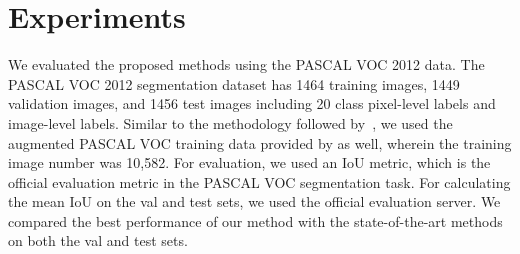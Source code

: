 \documentclass[10pt,twocolumn,letterpaper]{article}
\begin{document}
\section{Experiments}
We evaluated the proposed methods using the PASCAL VOC 2012 data. 
The PASCAL VOC 2012 segmentation dataset has 1464 training images, 1449
validation images, and 1456 test images including 20 class pixel-level
labels and image-level labels. 
Similar to the methodology followed by~\cite{ped15,papa15,sec}, 
we used the augmented PASCAL VOC training data provided by \cite{Bha14} as well, wherein the training image number was 10,582.
For evaluation, we used an IoU metric, which is the official evaluation metric in the PASCAL VOC segmentation task.
For calculating the mean IoU on the val and test sets, we used the official evaluation server.
We compared the best performance of our method with the state-of-the-art methods on both the val and test sets.
\end{document}
